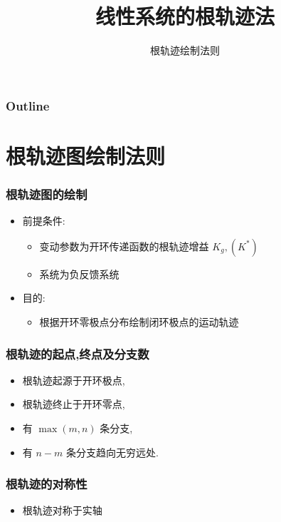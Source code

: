 \documentclass{beamer}
\subtitle{根轨迹绘制法则}
\title{线性系统的根轨迹法}
\author{}
\date{}
\begin{document}
\maketitle

\begin{frame}
\frametitle{Outline}
\setcounter{tocdepth}{3}
\tableofcontents
\end{frame}













\section{根轨迹图绘制法则}
\label{sec-1}
\begin{frame}
\frametitle{根轨迹图的绘制}
\label{sec-1-1}

\begin{itemize}
\item 前提条件:
\begin{itemize}
\item <2->变动参数为开环传递函数的根轨迹增益  $K_g,(K^*)$
\item <3->系统为负反馈系统
\end{itemize}
\item 目的:
\begin{itemize}
\item 根据开环零极点分布绘制闭环极点的运动轨迹
\end{itemize}
\end{itemize}
\end{frame}
\begin{frame}
\frametitle{根轨迹的起点,终点及分支数}
\label{sec-1-2}

\begin{itemize}
\item <2->根轨迹起源于开环极点,
\item <3->根轨迹终止于开环零点,
\item <4->有  $\max(m,n)$  条分支,
\item <5->有 $n-m$ 条分支趋向无穷远处.
\end{itemize}
\end{frame}
\begin{frame}
\frametitle{根轨迹的对称性}
\label{sec-1-3}

\begin{itemize}
\item <2->根轨迹对称于实轴
\end{itemize}
\end{frame}
\end{document}
